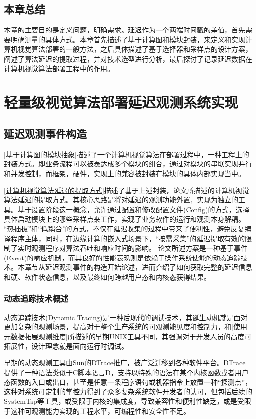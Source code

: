 \documentclass[master]{shtthesis}
\begin{document}
\section{本章总结}\label{本章总结}
本章的主要目的是定义问题，明确需求。延迟作为一个两端时间戳的差值，首先需要明确测量的具体方式。本章首先描述了基于计算图和模块封装，来定义和实现计算机视觉算法部署的一般方法，之后具体描述了基于选择器和采样点的设计方案，阐述了算法延迟的提取过程，并对技术选型进行分析，最后探讨了记录延迟数据在计算机视觉算法部署工程中的作用。

\chapter{轻量级视觉算法部署延迟观测系统实现}\label{轻量级视觉算法部署延迟观测系统实现}

\section{延迟观测事件构造}\label{延迟观测事件构造}
\ref{基于计算图的模块抽象}描述了一个计算机视觉算法在部署过程中，一种工程上的封装方式。即业务流程可以被表达成多个模块的组合，通过对模块的串联实现并行和并发控制，而框架，硬件，实现上的兼容被封装在模块的具体内部实现当中。

\ref{计算机视觉算法延迟的提取方式}描述了基于上述封装，论文所描述的计算机视觉算法延迟的提取方式。其核心思路是将对延迟的观测功能外置，实现为独立的工具。基于设置阶段这一概念，允许通过配置和修改配置文件(Config)的方式，选择具体启动模块上的哪些采样点来工作，实现了业务软件的运行和观测本身解耦。
“热插拔”和“低耦合”的方式，不仅在延迟收集的过程中带来了便利性，避免反复编译程序主体，同时，在边缘计算的嵌入式场景下，“按需采集”的延迟提取有效的限制了实时观测程序对算法吞吐和响应时间的影响。
论文所述方案是一种基于事件(Event)的响应机制，而其良好的性能表现则是依赖于操作系统使能的动态追踪技术。本章节从延迟观测事件的构造开始论述，进而介绍了如何获取完整的延迟信息和硬、软件状态信息，以及最终如何跨越用户态和内核态获得结果。
\subsection{动态追踪技术概述}\label{动态追踪技术概述}
动态追踪技术(Dynamic Tracing)\cite{keniston2007ptrace}是一种后现代的调试技术，其诞生动机就是面对更加复杂的观测场景，提高对于整个生产系统的可观测能见度和控制力，和\ref{使用元数据拓展观测维度}所描述的早期UNIX工具不同，其强调对于开发人员的高度可拓展性，设计理念就是面向运行时调试。

早期的动态观测工具由Sun的DTrace\cite{gregg2011dtrace}推广，被广泛迁移到各种软件平台。DTrace提供了一种语法类似于C脚本语言D，支持以特殊的语法在某个内核函数或者用户态函数的入口或出口，甚至是任意一条程序语句或机器指令上放置一种“探测点”，这种对系统可定制的掌控力得到了众多复杂系统软件开发者的认可，但包括后续的SystemTap\cite{prasad2005locating}等工具，或受限于内核的集成度，导致兼容性和便利性缺乏，或是受限于这种可观测能力实现的工程水平，可编程性和安全性不足。
\end{document}
